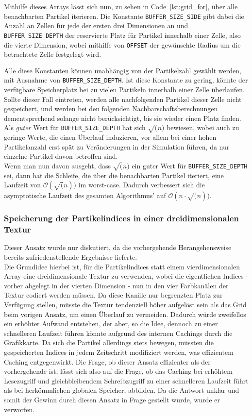 Mithilfe dieses Arrays lässt sich nun, zu sehen in Code~\ref{lst:grid_for}, über alle benachbarten Partikel iterieren. Die Konstante \texttt{BUFFER\_SIZE\_SIDE} gibt dabei die Anzahl an Zellen für jede der ersten drei Dimensionen an und \texttt{BUFFER\_SIZE\_DEPTH} der reservierte Platz für Partikel innerhalb einer Zelle, also die vierte Dimension, wobei mithilfe von \texttt{OFFSET} der gewünschte Radius um die betrachtete Zelle festgelegt wird.


Alle diese Konstanten können unabhängig von der Partikelzahl gewählt werden, mit Ausnahme von \texttt{BUFFER\_SIZE\_DEPTH}. Ist diese Konstante zu gering, könnte der verfügbare Speicherplatz bei zu vielen Partikeln innerhalb einer Zelle überlaufen. Sollte dieser Fall eintreten, werden alle nachfolgenden Partikel dieser Zelle nicht gespeichert, und werden bei den folgenden Nachbarschaftsberechnungen dementsprechend solange nicht berücksichtigt, bis sie wieder einen Platz finden.\\
Als \textit{guter} Wert für \texttt{BUFFER\_SIZE\_DEPTH} hat sich $\sqrt(n)$ bewiesen, wobei auch zu geringe Werte, die einen Überlauf induzieren, vor allem bei einer hohen Partikelanzahl erst spät zu Veränderungen in der Simulation führen, da nur einzelne Partikel davon betroffen sind.\\
Wenn man nun davon ausgeht, dass $\sqrt(n)$ ein guter Wert für \texttt{BUFFER\_SIZE\_DEPTH} sei, dann hat die Schleife, die über die benachbarten Partikel iteriert, eine Laufzeit von $\mathcal O(\sqrt(n))$ im worst-case. Dadurch verbessert sich die asymptotische Laufzeit des gesamten Algorithmus' auf $\mathcal O(n \cdot \sqrt(n))$.
\subsubsection{Speicherung der Partikelindices in einer dreidimensionalen Textur}
Dieser Ansatz wurde nur diskutiert, da die vorhergehende Herangehensweise bereits zufriedenstellende Ergebnisse lieferte.\\
Die Grundidee hierbei ist, für die Partikelindices statt einem vierdimensionalen Array eine dreidimensionale Textur zu verwenden, wobei die eigentlichen Indices - vorher abgelegt in der vierten Dimension - nun in den vier Farbkanälen der Textur codiert werden müssen. Da diese Kanäle nur begrenzten Platz zur Verfügung stellen, müsste die Textur tendenziell höher aufgelöst sein als das Grid beim vorigen Ansatz, um einen Überlauf zu vermeiden. Dadurch würde zweifellos ein erhöhter Aufwand entstehen, der aber, so die Idee, dennoch zu einer schnelleren Laufzeit führen könnte aufgrund des internen Cachings durch die Grafikkarte. Da sich die Partikel allerdings stets bewegen, müssten die gespeicherten Indices in jedem Zeitschritt modifiziert werden, was effizientem Caching entgegenwirkt. Die Frage, ob dieser Ansatz effizienter als der vorhergehende ist, lässt sich also auf die Frage, ob das Caching bei erhöhtem Lesezugriff und gleichbleibendem Schreibzugriff zu einer schnelleren Laufzeit führt als bei herkömmlichen globalen Speicher, abbilden. Da die Antwort unklar und somit der Gewinn durch diesen Ansatz in Frage gestellt wurde, wurde er verworfen.
